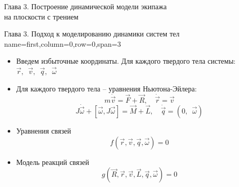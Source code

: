 \begin{myposter}{
    Глава 3. Построение динамической модели экипажа \\ на плоскости с трением
}

    \headerbox
    {Глава 3. Подход к моделированию динамики систем тел}
    {name=first,column=0,row=0,span=3}
    {
        {\huge\bf
            \vspace{10pt}
            \begin{itemize}
                \item {
                    Введем избыточные координаты. Для каждого твердого тела системы: \quad
                    $ \vec{r}, \enspace \vec{v}, \enspace \vec{q}, \enspace \vec{\omega} $
                }
                \item {
                    Для каждого твердого тела -- уравнения Ньютона-Эйлера:
                    $$ m\dot{\vec{v}} = \vec{F} + \vec{R}, \quad \dot{\vec{r}} = \vec{v} $$
                    $$ J\dot{\vec{\omega}} + [ \vec{\omega}, J\vec{\omega} ] = \vec{M} + \vec{L}, \quad \dot{\vec{q}} = (0, \enspace \vec{\omega}) $$
                }
                \item {
                    Уравнения связей
                    \vspace{-15pt}
                    $$ f(\vec{r}, \vec{v}, \vec{q}, \vec{\omega}) = 0 $$
                }
                \item {
                    Модель реакций связей
                    \vspace{-15pt}
                    $$ g(\vec{R}, \vec{r}, \vec{v}, \vec{L}, \vec{q}, \vec{\omega}) = 0 $$
                }
            \end{itemize}
            \vspace{10pt}
        }
    }
    

\end{myposter}

